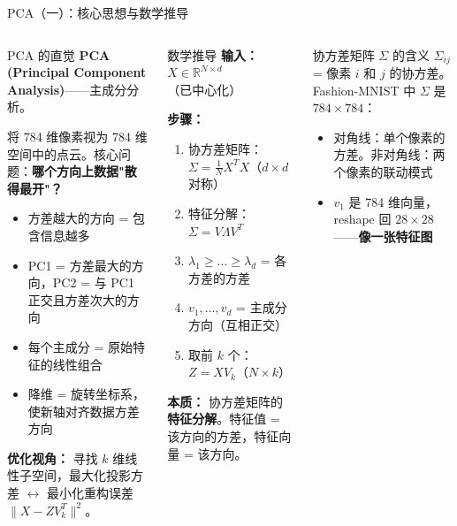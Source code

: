 \documentclass[aspectratio=169]{ctexbeamer}
\begin{document}
\begin{frame}[shrink=18]{PCA（一）：核心思想与数学推导}
\small

\begin{columns}[T]
\begin{block}{PCA 的直觉}
\footnotesize
\textbf{PCA (Principal Component Analysis)}——主成分分析。

将 784 维像素视为 784 维空间中的点云。核心问题：\textbf{哪个方向上数据"散得最开"？}

\begin{itemize}
  \item 方差越大的方向 = 包含信息越多
  \item PC1 = 方差最大的方向，PC2 = 与 PC1 正交且方差次大的方向
  \item 每个主成分 = 原始特征的线性组合
  \item 降维 = 旋转坐标系，使新轴对齐数据方差方向
\end{itemize}

\textbf{优化视角：} 寻找 $k$ 维线性子空间，最大化投影方差 $\leftrightarrow$ 最小化重构误差 $\|X - Z V_k^T\|^2$。
\end{block}

\begin{block}{数学推导}
\footnotesize
\textbf{输入：} $X \in \mathbb{R}^{N \times d}$（已中心化）

\textbf{步骤：}
\begin{enumerate}
  \item 协方差矩阵：$\Sigma = \frac{1}{N}X^T X$（$d \times d$ 对称）
  \item 特征分解：$\Sigma = V \Lambda V^T$
  \item $\lambda_1 \ge \dots \ge \lambda_d$ = 各方差的方差
  \item $v_1, \dots, v_d$ = 主成分方向（互相正交）
  \item 取前 $k$ 个：$Z = X V_k$（$N \times k$）
\end{enumerate}

\textbf{本质：} 协方差矩阵的\textbf{特征分解}。特征值 = 该方向的方差，特征向量 = 该方向。
\end{block}

\vspace{0.1cm}

\begin{block}{协方差矩阵 $\Sigma$ 的含义}
\footnotesize
$\Sigma_{ij}$ = 像素 $i$ 和 $j$ 的协方差。Fashion-MNIST 中 $\Sigma$ 是 $784\times784$：
\begin{itemize}
  \item 对角线：单个像素的方差。非对角线：两个像素的联动模式
  \item $v_1$ 是 784 维向量，reshape 回 $28\times28$——\textbf{像一张特征图}
\end{itemize}
\end{block}
\end{columns}
\end{frame}
\end{document}
